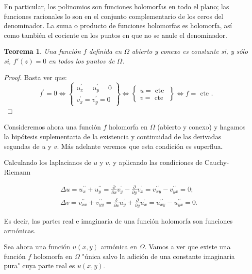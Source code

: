 \documentclass[10pt]{article}
\theoremstyle{plain}
\newtheorem{theorem}{Teorema}[section]
\theoremstyle{definition}
\theoremstyle{remark}
\begin{document}
En particular, los polinomios son funciones holomorfas en todo el plano; las funciones racionales lo son en el conjunto complementario de los ceros del denominador. La suma o producto de funciones holomorfas es holomorfa, así como también el cociente en los puntos en que no se anule el denominador.

\begin{theorem}
Una función $f$ definida en $\Omega$ abierto y conexo es constante si, y sólo si, $f'(z)=0$ en todos los puntos de $\Omega$.
\end{theorem}

\begin{proof}
Basta ver que:
$$f^{\prime}=0 \Longleftrightarrow\left\{\begin{array}{l}
u_{x}^{\prime}=u_{y}^{\prime}=0 \\
v_{x}^{\prime}=v_{y}^{\prime}=0
\end{array}\right\} \Longleftrightarrow\left\{\begin{array}{l}
u=\text { cte } \\
v=\text { cte }
\end{array}\right\} \Longleftrightarrow f=\text { cte } .$$
\end{proof}

Consideremos ahora una función $f$ holomorfa en $\Omega$ (abierto y conexo) y hagamos la hipótesis suplementaria de la existencia y continuidad de las derivadas segundas de $u$ y $v$. Más adelante veremos que esta condición es superflua.

Calculando los laplacianos de $u$ y $v$, y aplicando las condiciones de Cauchy-Riemann

$$
\begin{aligned}
& \Delta u=u_{x}^{\prime \prime}+u_{y}^{\prime \prime}=\frac{\partial}{\partial x} v_{y}^{\prime}-\frac{\partial}{\partial y} v_{x}^{\prime}=v_{x y}^{\prime \prime}-v_{y x}^{\prime \prime}=0 ; \\
& \Delta v=v_{x x}^{\prime \prime}+v_{y y}^{\prime \prime}=\frac{\delta}{\partial x} u_{y}^{\prime}+\frac{\partial}{\partial y} u_{x}^{\prime}=u_{x y}^{\prime \prime}-u_{y x}^{\prime \prime}=0 .
\end{aligned}
$$

Es decir, las partes real e imaginaria de una función holomorfa son funciones armónicas.

Sea ahora una función $u(x, y)$ armónica en $\Omega$. Vamos a ver que existe una función $f$ holomorfa en $\Omega$ "única salvo la adición de una constante imaginaria pura" cuya parte real es $u(x, y)$.
\end{document}
